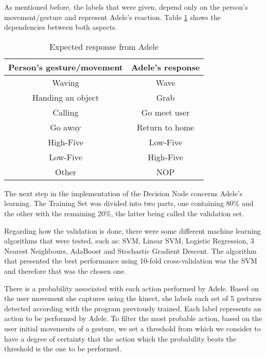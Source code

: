 As mentioned before, the labels that were given, depend only on the person's movement/gesture and represent Adele's reaction. Table \color{red}\ref{tab:expected_response} \color{black} shows the dependencies between both aspects.
\begin{table}[!h]
\centering
\caption{Expected response from Adele}
\label{tab:expected_response}
\begin{tabular}{|c|c|}
\hline
\textbf{Person's gesture/movement} & \textbf{Adele's response} \\ \hline
Waving                           & Wave                                 \\
Handing an object                & Grab                            		\\
Calling                          & Go meet user                         \\
Go away                          & Return to home                       \\
High-Five                        & Low-Five                             \\
Low-Five                         & High-Five                            \\
Other	                           & NOP                                  \\ \hline
\end{tabular}
\end{table}

The next step in the implementation of the Decision Node concerns Adele's learning. The Training Set was divided into two parts, one containing 80\% and the other with the remaining 20\%, the latter being called the validation set.

Regarding how the validation is done, there were some different machine learning algorithms that were tested, such as: SVM, Linear SVM, Logistic Regression, 3 Nearest Neighbours, AdaBoost and Stochastic Gradient Descent. The algorithm that presented the best performance using 10-fold cross-validation was the SVM and therefore that was the chosen one.

There is a probability associated with each action performed by Adele. Based on the user movement she captures using the kinect, she labels each set of 5 gestures detected according with the program previously trained. Each label represents an action to be performed by Adele. To filter the most probable action, based on the user initial movements of a gesture, we set a threshold from which we consider to have a degree of certainty that the action which the probability beats the threshold is the one to be performed. 

